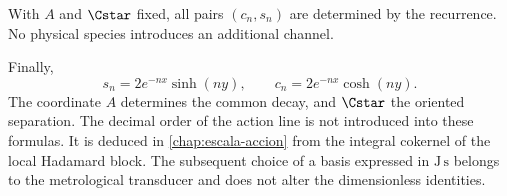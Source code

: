\begin{corollary}
With \(A\) and \(\Cstar\) fixed, all pairs \((c_n,s_n)\) are
determined by the recurrence. No physical species introduces an additional
channel.
\end{corollary}

Finally,
\[
 s_n=2e^{-nx}\sinh(ny),
 \qquad
 c_n=2e^{-nx}\cosh(ny).
\]
The coordinate \(A\) determines the common decay, and \(\Cstar\) the oriented
separation. The decimal order of the action line is not introduced into these
formulas. It is deduced in \cref{chap:escala-accion} from the integral cokernel
of the local Hadamard block. The subsequent choice of a basis
expressed in \(\mathrm{J\,s}\) belongs to the metrological transducer and does not
alter the dimensionless identities.
